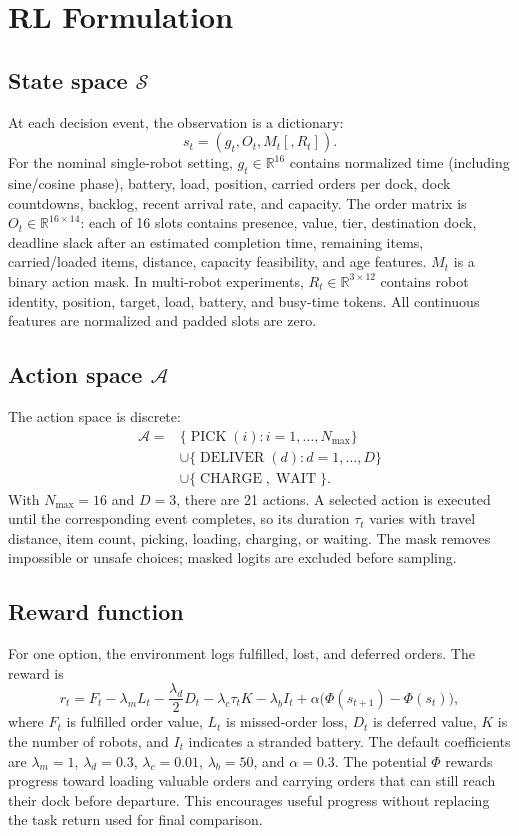 \documentclass[9pt,twocolumn]{article}
\begin{document}
\section{RL Formulation}
\subsection{State space $\mathcal{S}$}
At each decision event, the observation is a dictionary:
\[
s_t=(g_t,O_t,M_t[,R_t]).
\]
For the nominal single-robot setting, $g_t\in\mathbb{R}^{16}$ contains normalized time
(including sine/cosine phase), battery, load, position, carried orders per dock, dock
countdowns, backlog, recent arrival rate, and capacity. The order matrix is
$O_t\in\mathbb{R}^{16\times14}$: each of 16 slots contains presence, value, tier,
destination dock, deadline slack after an estimated completion time, remaining items,
carried/loaded items, distance, capacity feasibility, and age features. $M_t$ is a
binary action mask. In multi-robot experiments, $R_t\in\mathbb{R}^{3\times12}$ contains
robot identity, position, target, load, battery, and busy-time tokens. All continuous
features are normalized and padded slots are zero.

\subsection{Action space $\mathcal{A}$}
The action space is discrete:
\[
\begin{aligned}
\mathcal{A}={}&\{\operatorname{PICK}(i):i=1,\ldots,N_{\max}\}\\
&\cup\{\operatorname{DELIVER}(d):d=1,\ldots,D\}\\
&\cup\{\operatorname{CHARGE},\operatorname{WAIT}\}.
\end{aligned}
\]
With $N_{\max}=16$ and $D=3$, there are 21 actions. A selected action is executed until
the corresponding event completes, so its duration $\tau_t$ varies with travel distance,
item count, picking, loading, charging, or waiting. The mask removes impossible or unsafe
choices; masked logits are excluded before sampling.

\subsection{Reward function}
For one option, the environment logs fulfilled, lost, and deferred orders. The reward is
\[
r_t=F_t-\lambda_m L_t-\frac{\lambda_d}{2}D_t
 -\lambda_c\tau_t K-\lambda_b I_t+\alpha\bigl(\Phi(s_{t+1})-\Phi(s_t)\bigr),
\]
where $F_t$ is fulfilled order value, $L_t$ is missed-order loss, $D_t$ is deferred
value, $K$ is the number of robots, and $I_t$ indicates a stranded battery. The default
coefficients are $\lambda_m=1$, $\lambda_d=0.3$, $\lambda_c=0.01$, $\lambda_b=50$, and
$\alpha=0.3$. The potential $\Phi$ rewards progress toward loading valuable orders and
carrying orders that can still reach their dock before departure. This encourages useful
progress without replacing the task return used for final comparison.
\end{document}
